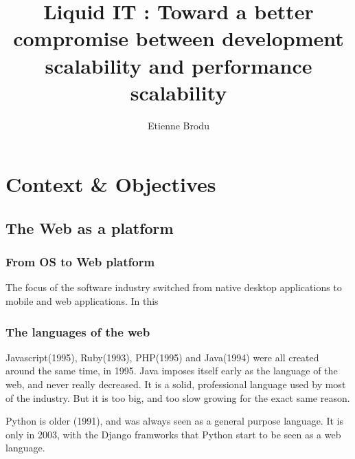 \documentclass[12pt]{report}
\begin{document}
\title{Liquid IT : Toward a better compromise between development scalability and performance scalability }
\author{Etienne Brodu}

\maketitle



\tableofcontents


% 

\chapter{Context \& Objectives}
  \section{The Web as a platform}

    \subsection{From OS to Web platform}

      The focus of the software industry switched from native desktop applications to mobile and web applications.
      In this 

    \subsection{The languages of the web}

      Javascript(1995), Ruby(1993), PHP(1995) and Java(1994) were all created around the same time, in 1995.
      Java imposes itself early as the language of the web, and never really decreased. It is a solid, professional language used by most of the industry.
      But it is too big, and too slow growing for the exact same reason.

      Python is older (1991), and was always seen as a general purpose language.
      It is only in 2003, with the Django framworks that Python start to be seen as a web language.
\end{document}
